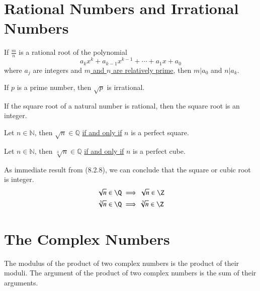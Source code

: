 \documentclass[11pt]{article}
\begin{document}
	\section{Rational Numbers and Irrational Numbers}
		\begin{theorem}
			If $\frac{m}{n}$ is a rational root of the polynomial
			\[
				a_k x^k + a_{k-1} x^{k-1} + \cdots + a_1 x + a_0
			\]
			where $a_j$ are integers and \ul{$m$ and $n$ are relatively prime}, then $m | a_0$ and $n | a_k$.
		\end{theorem}
		
		\begin{theorem}[8.2.6]
			If $p$ is a prime number, then $\sqrt{p}$ is irrational.
		\end{theorem}
		
		\begin{theorem}[8.2.8]
			If the square root of a natural number is rational, then the square root is an integer.
		\end{theorem}
		
		\begin{theorem}[Extended 8.2.8]
			Let $n \in \mathbb{N}$, then $\sqrt{n} \in \mathbb{Q}$ \ul{if and only if} $n$ is a perfect square.
		\end{theorem}
		
		\begin{theorem}[Extended 8.2.8]
			Let $n \in \mathbb{N}$, then $\sqrt[3]{n} \in \mathbb{Q}$ \ul{if and only if} $n$ is a perfect cube.
		\end{theorem}
		
		\begin{remark}
			As immediate result from (8.2.8), we can conclude that the square or cubic root is integer.
			\begin{gather*}
				\sqrt{n} \in \Q \implies \sqrt{n} \in \Z \\
				\sqrt[3]{n} \in \Q \implies \sqrt[3]{n} \in \Z
			\end{gather*}
		\end{remark}
		
	
	\section{The Complex Numbers}
		\begin{theorem}[9.2.3]
			The modulus of the product of two complex numbers is the product of their moduli. The argument of the product of two complex numbers is the sum of their arguments.
		\end{theorem}
		
\end{document}
